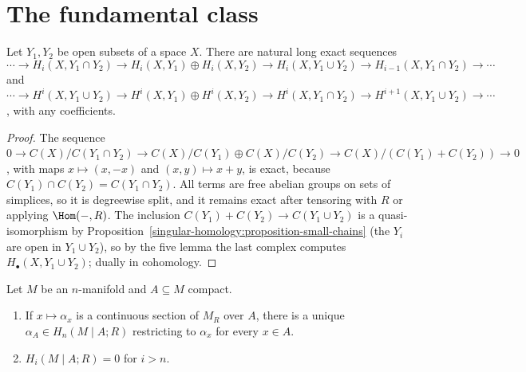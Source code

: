\section{The fundamental class}\label{poincare-duality:section-fundamental-class}

\begin{lemma}\label{poincare-duality:lemma-relative-mayer-vietoris}
Let $Y_1, Y_2$ be open subsets of a space $X$. There are natural long exact sequences
\[
\cdots \to H_i(X, Y_1 \cap Y_2) \to H_i(X, Y_1) \oplus H_i(X, Y_2) \to H_i(X, Y_1 \cup Y_2) \to H_{i-1}(X, Y_1 \cap Y_2) \to \cdots
\]
and $\cdots \to H^i(X, Y_1 \cup Y_2) \to H^i(X, Y_1) \oplus H^i(X, Y_2) \to H^i(X, Y_1 \cap Y_2) \to H^{i+1}(X, Y_1 \cup Y_2) \to \cdots$, with any coefficients.
\end{lemma}

\begin{proof}
The sequence $0 \to C(X)/C(Y_1 \cap Y_2) \to C(X)/C(Y_1) \oplus C(X)/C(Y_2) \to C(X)/(C(Y_1) + C(Y_2)) \to 0$, with maps $x \mapsto (x, -x)$ and $(x, y) \mapsto x + y$, is
exact, because $C(Y_1) \cap C(Y_2) = C(Y_1 \cap Y_2)$. All terms are free abelian groups on sets of simplices, so it is degreewise split, and it remains exact after
tensoring with $R$ or applying $\Hom(-, R)$. The inclusion $C(Y_1) + C(Y_2) \to C(Y_1 \cup Y_2)$ is a quasi-isomorphism by
Proposition~\ref{singular-homology:proposition-small-chains} (the $Y_i$ are open in $Y_1 \cup Y_2$), so by the five lemma the last complex computes
$H_\bullet(X, Y_1 \cup Y_2)$; dually in cohomology.
\end{proof}

\begin{lemma}\label{poincare-duality:lemma-compact-sets}
Let $M$ be an $n$-manifold and $A \subseteq M$ compact.
\begin{enumerate}
\item If $x \mapsto \alpha_x$ is a continuous section of $M_R$ over $A$, there is a unique $\alpha_A \in H_n(M \mid A; R)$ restricting to $\alpha_x$ for every $x \in A$.
\item $H_i(M \mid A; R) = 0$ for $i > n$.
\end{enumerate}
\end{lemma}

